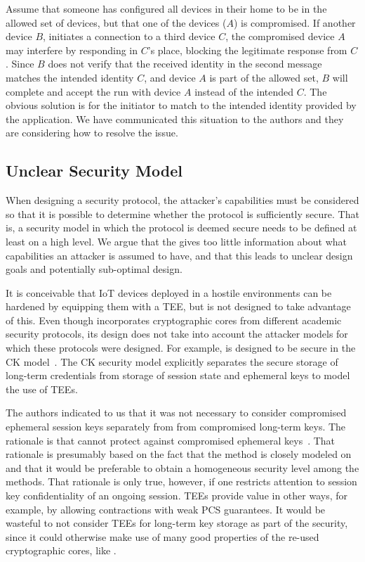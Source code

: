 \documentclass[runningheads, envcountsame, hidelinks, a4paper, x11names]{article}
\begin{document}
Assume that someone has configured all devices in their home to be in the
allowed set of devices, but that one of the devices ($A$) is compromised.
%
If another device $B$, initiates a connection to a third device $C$, the
compromised device $A$ may interfere by responding in $C$'s place, blocking
the legitimate response from $C$.
%
Since $B$ does not verify that the received identity in the second message
matches the intended identity $C$, and device $A$ is part of the allowed set,
$B$ will complete and accept the \mEdhoc{} run with device $A$ instead of the
intended $C$.
%
The obvious solution is for the initiator to match \mIdcredr{} to the intended
identity provided by the application.
%
We have communicated this situation to the \mEdhoc{} authors and they are considering
how to resolve the issue.
%

\subsection{Unclear Security Model}
When designing a security protocol, the attacker's capabilities must be
considered so that it is possible to determine whether the protocol is
sufficiently secure.
%
That is, a security model in which the protocol is deemed
secure needs to be defined at least on a high level.
%
We argue that the \mSpec{} gives too little information about what capabilities
an attacker is assumed to have, and that this leads to unclear design goals and
potentially sub-optimal design.
%
%

It is conceivable that IoT devices deployed in a hostile environments can be
hardened by equipping them with a TEE, but \mEdhoc{} is not %
designed to take advantage of this.
%
Even though \mEdhoc{} incorporates cryptographic cores from different academic
security protocols, its design does not take into account the attacker models
for which these protocols were designed.
%
For example, \mOptls{} is designed to be secure in the CK
model~\cite{DBLP:conf/crypto/CanettiK02}.
%
The CK security model explicitly separates the secure storage of long-term
credentials from storage of session state and ephemeral keys to model the 
use of TEEs.
%

The \mEdhoc{} authors indicated to us that it was
not necessary to consider compromised ephemeral session keys separately from
from compromised long-term keys.
%
The rationale is that \mSigma{} cannot protect against compromised ephemeral
keys~\cite{personalCommunication}.
%
That rationale is presumably based on the fact that the \mSigSig{} method is
closely modeled on \mSigmaI{} and that it would be preferable to obtain a
homogeneous security level among the \mEdhoc{}
methods.
%
That rationale is only true, however, if one restricts attention to session key
confidentiality of an ongoing session.
%
TEEs provide value in other ways, for example, by allowing contractions with
weak PCS guarantees.
%
It would be wasteful to not consider TEEs for long-term key storage as part of
the security, since it could otherwise make use of many good properties of the
re-used cryptographic cores, like \mOptls.
%
\end{document}
